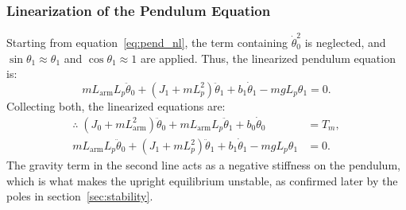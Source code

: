 \documentclass[a4paper,11pt]{article}
\newcommand{\La}{L_{\mathrm{arm}}}
\begin{document}
\subsubsection{Linearization of the Pendulum Equation}
Starting from equation~\ref{eq:pend_nl}, the term containing $\dot\theta_0^2$ is neglected, and $\sin\theta_1 \approx \theta_1$ and $\cos\theta_1 \approx 1$ are applied. Thus, the linearized pendulum equation is:
\begin{equation}
  m \La L_p \ddot\theta_0 + \left(J_1 + m L_p^2\right)\ddot\theta_1 + b_1 \dot\theta_1 - m g L_p \theta_1 = 0 .
\end{equation}
Collecting both, the linearized equations are:
\begin{equation}
\begin{aligned}
  \therefore\; \left(J_0 + m \La^2\right)\ddot\theta_0 + m \La L_p \ddot\theta_1 + b_0 \dot\theta_0 &= T_m ,\\
  m \La L_p \ddot\theta_0 + \left(J_1 + m L_p^2\right)\ddot\theta_1 + b_1 \dot\theta_1 - m g L_p \theta_1 &= 0 .
\end{aligned}
\label{eq:lin}
\end{equation}
The gravity term in the second line acts as a negative stiffness on the pendulum, which is what makes the upright equilibrium unstable, as confirmed later by the poles in section~\ref{sec:stability}.
\end{document}
